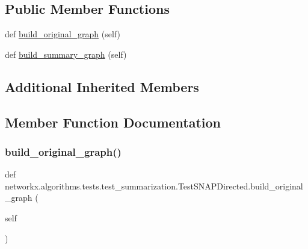 \subsection*{Public Member Functions}
\begin{DoxyCompactItemize}
\item 
def \hyperlink{classnetworkx_1_1algorithms_1_1tests_1_1test__summarization_1_1TestSNAPDirected_af6ff1256bf5b31871168cbbc53c4b308}{build\+\_\+original\+\_\+graph} (self)
\item 
def \hyperlink{classnetworkx_1_1algorithms_1_1tests_1_1test__summarization_1_1TestSNAPDirected_a82531cc4ef2fca3233a00500b33f601e}{build\+\_\+summary\+\_\+graph} (self)
\end{DoxyCompactItemize}
\subsection*{Additional Inherited Members}


\subsection{Member Function Documentation}
\mbox{\label{classnetworkx_1_1algorithms_1_1tests_1_1test__summarization_1_1TestSNAPDirected_af6ff1256bf5b31871168cbbc53c4b308}} 
\subsubsection{\texorpdfstring{build\+\_\+original\+\_\+graph()}{build\_original\_graph()}}
{\footnotesize\ttfamily def networkx.\+algorithms.\+tests.\+test\+\_\+summarization.\+Test\+S\+N\+A\+P\+Directed.\+build\+\_\+original\+\_\+graph (\begin{DoxyParamCaption}\item[{}]{self }\end{DoxyParamCaption})}

